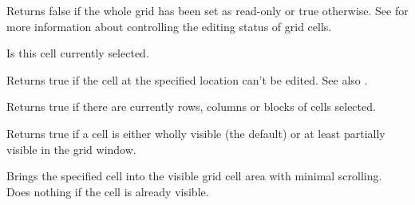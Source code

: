 \label{wxgridiseditable}


Returns false if the whole grid has been set as read-only or true otherwise.
See  for more information about
controlling the editing status of grid cells.



\label{wxgridisinselection}



Is this cell currently selected.



\label{wxgridisreadonly}


Returns true if the cell at the specified location can't be edited.
See also .



\label{wxgridisselection}


Returns true if there are currently rows, columns or blocks of cells selected.



\label{wxgridisvisible}



Returns true if a cell is either wholly visible (the default) or at least partially
visible in the grid window.



\label{wxgridmakecellvisible}



Brings the specified cell into the visible grid cell area with minimal scrolling. Does
nothing if the cell is already visible.



